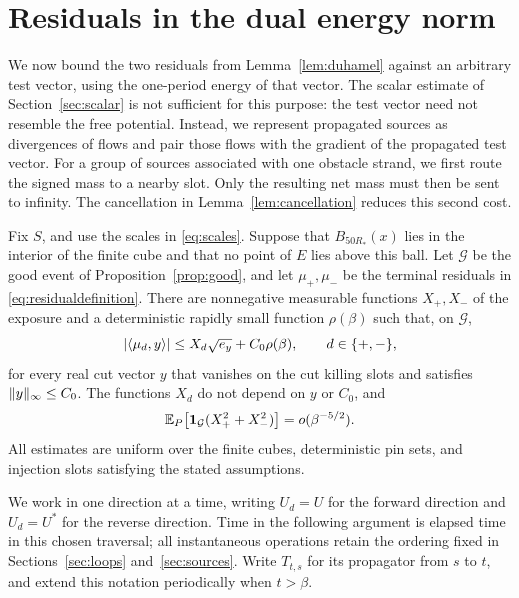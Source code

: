 \section{Residuals in the dual energy norm}\label{sec:energy}

We now bound the two residuals from Lemma~\ref{lem:duhamel} against an
arbitrary test vector, using the one-period energy of that vector.
The scalar estimate of Section~\ref{sec:scalar} is not sufficient for
this purpose: the test vector need not resemble the free potential.
Instead, we represent propagated sources as divergences of flows and
pair those flows with the gradient of the propagated test vector.
For a group of sources associated with one obstacle strand, we first
route the signed mass to a nearby slot.  Only the resulting net mass
must then be sent to infinity.  The cancellation in
Lemma~\ref{lem:cancellation} reduces this second cost.

\begin{proposition}\label{prop:dualenergy}
Fix \(S\), and use the scales in \eqref{eq:scales}.  Suppose that
\(B_{50R_*}(x)\) lies in the interior of the finite cube and that no
point of \(E\) lies above this ball.  Let \(\mathcal G\) be the good
event of Proposition~\ref{prop:good}, and let \(\mu_+,\mu_-\) be the
terminal residuals in \eqref{eq:residualdefinition}.
There are nonnegative measurable functions \(X_+,X_-\) of the exposure
and a deterministic rapidly small function \(\rho(\beta)\) such that,
on \(\mathcal G\),
\begin{equation}\label{eq:dualenergy}
 \lvert \langle \mu_d,y\rangle\rvert
 \le X_d\sqrt{e_y}+C_0\rho(\beta),
 \qquad d\in\{+,-\},
\end{equation}
for every real cut vector \(y\) that vanishes on the cut killing slots
and satisfies \(\lVert y\rVert_\infty\le C_0\).  The functions \(X_d\) do not
depend on \(y\) or \(C_0\), and
\begin{equation}\label{eq:dualenergyexpectation}
 \mathbb E_P\!\left[\mathbf 1_{\mathcal G}(X_+^2+X_-^2)\right]
 =o(\beta^{-5/2}).
\end{equation}
All estimates are uniform over the finite cubes, deterministic pin sets,
and injection slots satisfying the stated assumptions.
\end{proposition}

We work in one direction at a time, writing \(U_d=U\) for the forward
direction and \(U_d=U^*\) for the reverse direction.  Time in the
following argument is elapsed time in this chosen traversal; all
instantaneous operations retain the ordering fixed in
Sections~\ref{sec:loops} and~\ref{sec:sources}.
Write \(T_{t,s}\) for its propagator from \(s\) to \(t\), and extend
this notation periodically when \(t>\beta\).

